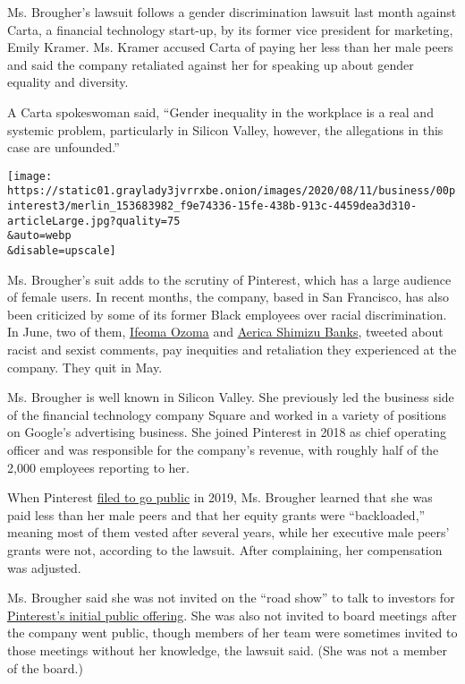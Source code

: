 Ms. Brougher's lawsuit follows a gender discrimination lawsuit last
month against Carta, a financial technology start-up, by its former vice
president for marketing, Emily Kramer. Ms. Kramer accused Carta of
paying her less than her male peers and said the company retaliated
against her for speaking up about gender equality and diversity.

A Carta spokeswoman said, ``Gender inequality in the workplace is a real
and systemic problem, particularly in Silicon Valley, however, the
allegations in this case are unfounded.''

\texttt{[image: https://static01.graylady3jvrrxbe.onion/images/2020/08/11/business/00pinterest3/merlin\_153683982\_f9e74336-15fe-438b-913c-4459dea3d310-articleLarge.jpg?quality=75\\\&auto=webp\\\&disable=upscale]}

Ms. Brougher's suit adds to the scrutiny of Pinterest, which has a large
audience of female users. In recent months, the company, based in San
Francisco, has also been criticized by some of its former Black
employees over racial discrimination. In June, two of them,
\href{https://twitter.com/IfeomaOzoma/status/1272546213322080258}{Ifeoma
Ozoma} and
\href{https://twitter.com/erikashimizu/status/1272547227177713664}{Aerica
Shimizu Banks}, tweeted about racist and sexist comments, pay inequities
and retaliation they experienced at the company. They quit in May.

Ms. Brougher is well known in Silicon Valley. She previously led the
business side of the financial technology company Square and worked in a
variety of positions on Google's advertising business. She joined
Pinterest in 2018 as chief operating officer and was responsible for the
company's revenue, with roughly half of the 2,000 employees reporting to
her.

When Pinterest
\href{https://www.nytimes3xbfgragh.onion/2019/03/22/technology/pinterest-ipo.html}{filed
to go public} in 2019, Ms. Brougher learned that she was paid less than
her male peers and that her equity grants were ``backloaded,'' meaning
most of them vested after several years, while her executive male peers'
grants were not, according to the lawsuit. After complaining, her
compensation was adjusted.

Ms. Brougher said she was not invited on the ``road show'' to talk to
investors for
\href{https://www.nytimes3xbfgragh.onion/2019/04/18/technology/pinterest-stock.html}{Pinterest's
initial public offering}. She was also not invited to board meetings
after the company went public, though members of her team were sometimes
invited to those meetings without her knowledge, the lawsuit said. (She
was not a member of the board.)


